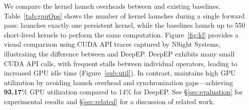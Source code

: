  We compare the kernel launch overheads between \sysname and existing baselines.
Table~\ref{tab:gpuOps} shows the number of kernel launches during a single forward pass: \sysname launches exactly one persistent kernel, while the baselines launch up to 550 short-lived kernels to perform the same computation.
Figure~\ref{fig:kl} provides a visual comparison using CUDA API traces captured by NSight Systems, illustrating the difference between \sysname and DeepEP.
DeepEP exhibits many small CUDA API calls, with frequent stalls between individual operators, leading to increased GPU idle time (Figure~\ref{sub:util}).
In contrast, \sysname maintains high GPU utilization by avoiding launch overhead and synchronization gaps—achieving \textbf{93.17}\%
GPU utilization compared to 14\% for DeepEP. See \S\ref{sec:evaluation} for experimental results and \S\ref{sec:related}
for a discussion of related work.